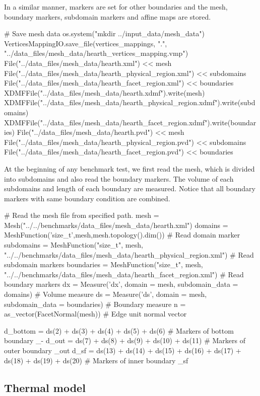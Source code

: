 In a similar manner, markers are set for other boundaries and the mesh, boundary markers, subdomain markers and affine maps are stored. 

\begin{python}
# Save mesh data
os.system("mkdir ../input_data/mesh_data")
VerticesMappingIO.save_file(vertices_mappings, ".", "../data_files/mesh_data/hearth_vertices_mapping.vmp")
File("../data_files/mesh_data/hearth.xml") << mesh
File("../data_files/mesh_data/hearth_physical_region.xml") << subdomains
File("../data_files/mesh_data/hearth_facet_region.xml") << boundaries
XDMFFile("../data_files/mesh_data/hearth.xdmf").write(mesh)
XDMFFile("../data_files/mesh_data/hearth_physical_region.xdmf").write(subdomains)
XDMFFile("../data_files/mesh_data/hearth_facet_region.xdmf").write(boundaries)
File("../data_files/mesh_data/hearth.pvd") << mesh
File("../data_files/mesh_data/hearth_physical_region.pvd") << subdomains
File("../data_files/mesh_data/hearth_facet_region.pvd") << boundaries
\end{python}

At the beginning of any benchmark test, we first read the mesh, which is divided into subdomains and also read the boundary markers. The volume of each subdomains and length of each boundary are measured. Notice that all boundary markers with same boundary condition are combined.

\begin{python}
# Read the mesh file from specified path.
mesh = Mesh("../../benchmarks/data_files/mesh_data/hearth.xml")
domains = MeshFunction('size_t',mesh,mesh.topology().dim()) # Read domain marker
subdomains = MeshFunction("size_t", mesh, "../../benchmarks/data_files/mesh_data/hearth_physical_region.xml") # Read subdomain markers
boundaries = MeshFunction("size_t", mesh, "../../benchmarks/data_files/mesh_data/hearth_facet_region.xml") # Read boundary markers
dx = Measure('dx', domain = mesh, subdomain_data = domains) # Volume measure
ds = Measure('ds', domain = mesh, subdomain_data = boundaries) # Boundary measure
n = as_vector(FacetNormal(mesh)) # Edge unit normal vector

d_bottom = ds(2) + ds(3) + ds(4) + ds(5) + ds(6) # Markers of bottom boundary \gamma_{-}
d_out = ds(7) + ds(8) + ds(9) + ds(10) + ds(11) # Markers of outer boundary \gamma_{out}
d_sf = ds(13) + ds(14) + ds(15) + ds(16) + ds(17) + ds(18) + ds(19) + ds(20) # Markers of inner boundary \gamma_{sf}
\end{python}


\subsection{Thermal model}\label{thermal_model}

